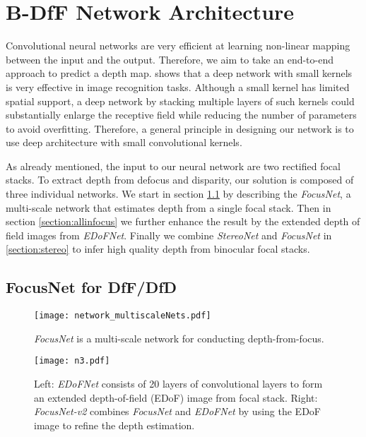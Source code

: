 \documentclass[10pt,twocolumn,letterpaper]{article}
\begin{document}
\section{B-DfF Network Architecture}

\label{section:NetworkArchitectures}

Convolutional neural networks are very efficient at learning non-linear mapping between the input and the output. Therefore, we aim to take an end-to-end approach to predict a depth map. \cite{simonyan14} shows that a deep network with small kernels is very effective in image recognition tasks. Although a small kernel has limited spatial support, a deep network by stacking multiple layers of such kernels could substantially enlarge the receptive field while reducing the number of parameters to avoid overfitting. Therefore, a general principle in designing our network is to use deep architecture with small convolutional kernels.

As already mentioned, the input to our neural network are two rectified focal stacks. To extract depth from defocus and disparity, our solution is composed of three individual networks. We start in section \ref{section:multiscale} by describing the \emph{FocusNet}, a multi-scale network that estimates depth from a single focal stack. Then in section \ref{section:allinfocus} we further enhance the result by the extended depth of field images from \emph{EDoFNet}. Finally we combine \emph{StereoNet} and \emph{FocusNet} in \ref{section:stereo} to infer high quality depth from binocular focal stacks.


\subsection{FocusNet for DfF/DfD}
\label{section:multiscale}

\begin{figure}[t]
\begin{center}
   \texttt{[image: network\_multiscaleNets.pdf]}
\end{center}
\vspace{-8pt}
   \caption{\emph{FocusNet} is a multi-scale network for conducting depth-from-focus.}
\label{fig:network_dfdMultiScale}
\end{figure}

\begin{figure}[t]
\begin{center}
   \texttt{[image: n3.pdf]}
\end{center}
\vspace{-8pt}
   \caption{Left: \emph{EDoFNet} consists of 20 layers of convolutional layers to form an extended depth-of-field (EDoF) image from focal stack. Right: \emph{FocusNet-v2} combines \emph{FocusNet} and \emph{EDoFNet} by using the EDoF image to refine the depth estimation.}
\label{fig:network_allinfocus}
\end{figure}
\end{document}
